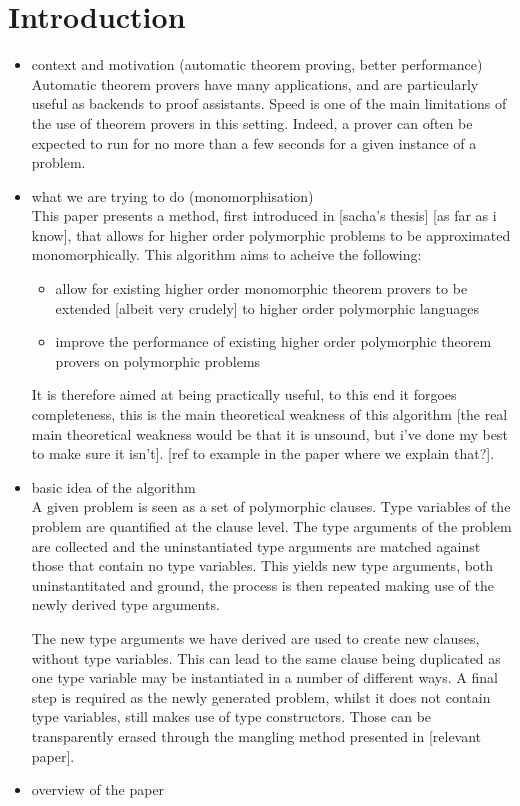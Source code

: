 \documentclass{article}
\begin{document}
\section{Introduction}
\begin{itemize}
    \item context and motivation (automatic theorem proving, better performance)\\
       Automatic theorem provers have many applications, and are particularly useful as backends to proof assistants. Speed is one of the main limitations of the use of theorem provers in this setting. Indeed, a prover can often be expected to run for no more than a few seconds for a given instance of a problem.
    \item what we are trying to do (monomorphisation)\\
       This paper presents a method, first introduced in [sacha's thesis] [as far as i know], that allows for higher order polymorphic problems to be approximated monomorphically. This algorithm aims to acheive the following:
         \begin{itemize}
            \item allow for existing higher order monomorphic theorem provers to be extended [albeit very crudely] to higher order polymorphic languages
            \item improve the performance of existing higher order polymorphic theorem provers on polymorphic problems
         \end{itemize}

         It is therefore aimed at being practically useful, to this end it forgoes completeness, this is the main theoretical weakness of this algorithm [the real main theoretical weakness would be that it is unsound, but i've done my best to make sure it isn't]. [ref to example in the paper where we explain that?]. 

    \item basic idea of the algorithm\\
    A given problem is seen as a set of polymorphic clauses. Type variables of the problem are quantified at the clause level. The type arguments of the problem are collected and the uninstantiated type arguments are matched against those that contain no type variables. This yields new type arguments, both uninstantitated and ground, the process is then repeated making use of the newly derived type arguments.

    The new type arguments we have derived are used to create new clauses, without type variables. This can lead to the same clause being duplicated as one type variable may be instantiated in a number of different ways.
    A final step is required as the newly generated problem, whilst it does not contain type variables, still makes use of type constructors. Those can be transparently erased through the mangling method presented in [relevant paper].
    \item overview of the paper


\end{itemize}
\end{document}
